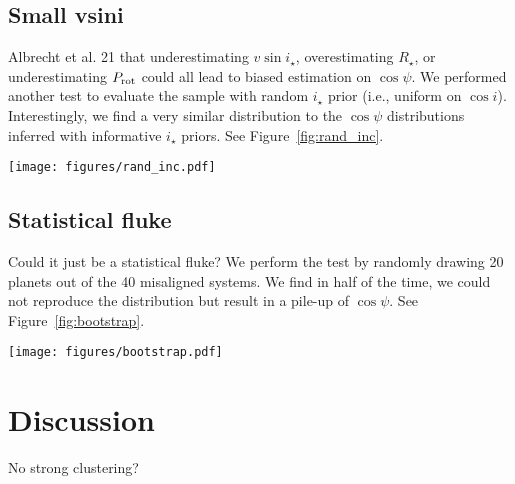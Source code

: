 \documentclass[twocolumn]{aastex631}
\begin{document}
\subsection{Small vsini}
Albrecht et al. 21 that underestimating $v\sin{i_\star}$, overestimating $R_\star$, or underestimating $P_{\rm rot}$ could all lead to biased estimation on $\cos{\psi}$. We performed another test to evaluate the sample with random $i_\star$ prior (i.e., uniform on $\cos{i}$). Interestingly, we find a very similar distribution to the $\cos{\psi}$ distributions inferred with informative $i_\star$ priors. See Figure~\ref{fig:rand_inc}.

\begin{figure*}[ht!]
    \begin{centering}
        \texttt{[image: figures/rand\_inc.pdf]}
        \caption{$\cos{\psi}$ distributions for the $i_\star$ sample with/without informative $i_\star$ priors.}
        \label{fig:rand_inc}
    \end{centering}
\end{figure*}

\subsection{Statistical fluke}
Could it just be a statistical fluke? We perform the test by randomly drawing 20 planets out of the 40 misaligned systems. We find in half of the time, we could not reproduce the distribution but result in a pile-up of $\cos{\psi}$. See Figure~\ref{fig:bootstrap}.

\begin{figure*}[ht!]
    \begin{centering}
        \texttt{[image: figures/bootstrap.pdf]}
        \caption{$\cos{\psi}$ distributions for the $i_\star$ sample with/without informative $i_\star$ priors.}
        \label{fig:bootstrap}
    \end{centering}
\end{figure*}

\section{Discussion}
No strong clustering?


\end{document}
